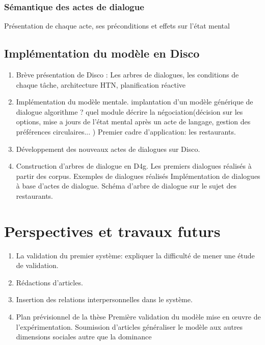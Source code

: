 \documentclass[a4paper,french]{article}
\begin{document}
\subsubsection{Sémantique des actes de dialogue}
Présentation de chaque acte, ses préconditions et effets sur l'état mental

\subsection{Implémentation du modèle en Disco}
\begin{enumerate}
\item Brève présentation de Disco : Les arbres de dialogues, les conditions de chaque tâche, architecture HTN, planification réactive
\item Implémentation du modèle mentale.	
\subsubitem implantation d'un modèle générique de dialogue
\subsubitem algorithme ? quel module décrire la négociation(décision sur les options, mise a jours de l’état mental après un acte de langage, gestion des préférences circulaires... )
\subsubitem Premier cadre d'application: les restaurants. 
\item Développement des nouveaux actes de dialogues sur Disco. 
\item Construction d'arbres de dialogue en D4g.
\subitem Les premiers dialogues réalisés à partir  des corpus.
\subsubitem Exemples de dialogues réalisés
\subitem Implémentation de dialogues à base d'actes de dialogue. 
\subsubitem Schéma d'arbre de dialogue sur le sujet des restaurants. 
\end{enumerate}

\section{Perspectives et travaux futurs}
\label{pers}
\begin{enumerate}
\item La validation du premier système: expliquer la difficulté de mener une étude de validation.
\item Rédactions d'articles.
\item Insertion des relations interpersonnelles dans le système.
\item Plan prévisionnel de la thèse
 \subitem Première validation du modèle
 	\subsubitem mise en œuvre de l’expérimentation.
 \subitem Soumission d'articles
 \subitem généraliser le modèle aux autres dimensions sociales autre que la dominance
\end{enumerate}
	\vskip 4pt
	
	{\footnotesize
			} %
	
\end{document}
